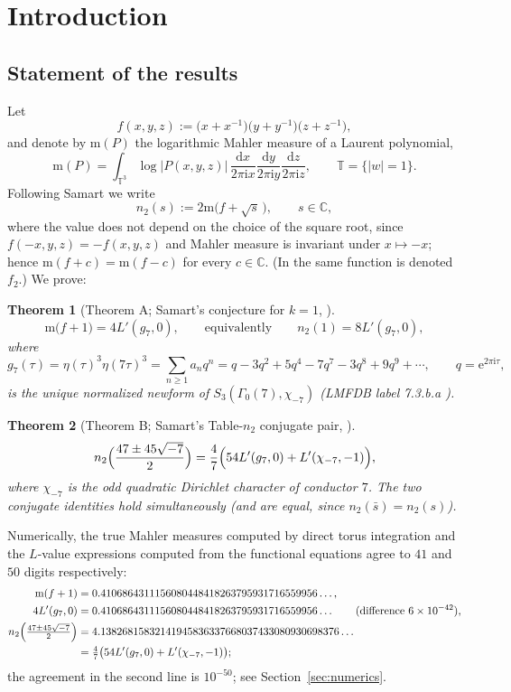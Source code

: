 \documentclass[11pt]{article}
\newtheorem{theorem}{Theorem}[section]
\theoremstyle{definition}
\theoremstyle{remark}
\newcommand{\Cc}{\mathbb{C}}
\newcommand{\Tt}{\mathbb{T}}
\newcommand{\ii}{\mathrm{i}}
\newcommand{\e}{\mathrm{e}}
\newcommand{\id}{\mathrm{d}}
\newcommand{\m}{\mathrm{m}}
\begin{document}
\section{Introduction}

\subsection{Statement of the results}

Let
\[
  f(x,y,z):=\bigl(x+x^{-1}\bigr)\bigl(y+y^{-1}\bigr)\bigl(z+z^{-1}\bigr),
\]
and denote by $\m(P)$ the logarithmic Mahler measure of a Laurent
polynomial,
\[
  \m(P)=\int_{\Tt^3}\log|P(x,y,z)|\,
  \frac{\id x}{2\pi \ii x}\frac{\id y}{2\pi \ii y}\frac{\id z}{2\pi \ii z},
  \qquad \Tt=\{|w|=1\}.
\]
Following Samart \cite{Sa13,Sa15} we write
\begin{equation}\label{eq:f2def}
  n_2(s):=2\m\bigl(f+\sqrt{s}\,\bigr),\qquad s\in\Cc,
\end{equation}
where the value does not depend on the choice of the square root, since
$f(-x,y,z)=-f(x,y,z)$ and Mahler measure is invariant under
$x\mapsto -x$; hence $\m(f+c)=\m(f-c)$ for every $c\in\Cc$. (In
\cite{Sa13} the same function is denoted $f_2$.) We prove:

\begin{theorem}[Theorem A; Samart's conjecture for $k=1$, {\cite{Sa13,Sa15}}]\label{thm:A}
\[
  \m\bigl(f+1\bigr)=4L'(g_7,0),
  \qquad\text{equivalently}\qquad
  n_2(1)=8L'(g_7,0),
\]
where
\[
  g_7(\tau)=\eta(\tau)^3\eta(7\tau)^3=\sum_{n\ge1}a_nq^n
  =q-3q^2+5q^4-7q^7-3q^8+9q^9+\cdots,\qquad q=\e^{2\pi \ii\tau},
\]
is the unique normalized newform of $S_3(\Gamma_0(7),\chi_{-7})$
\textup{(}LMFDB label \textup{7.3.b.a} \cite{LMFDB}\textup{)}.
\end{theorem}

\begin{theorem}[Theorem B; Samart's Table-$n_2$ conjugate pair, {\cite{Sa15}}]\label{thm:B}
\[
  n_2\Bigl(\frac{47\pm45\sqrt{-7}}2\Bigr)
  =\frac47\Bigl(54L'(g_7,0)+L'(\chi_{-7},-1)\Bigr),
\]
where $\chi_{-7}$ is the odd quadratic Dirichlet character of conductor
$7$. The two conjugate identities hold simultaneously \textup{(}and are
equal, since $n_2(\bar s)=n_2(s)$\textup{)}.
\end{theorem}

Numerically, the true Mahler measures computed by direct torus integration
and the $L$-value expressions computed from the functional equations agree
to $41$ and $50$ digits respectively:
\begin{align*}
  \m(f+1)&=0.4106864311156080448418263795931716559956\ldots,\\
  4L'(g_7,0)&=0.4106864311156080448418263795931716559956\ldots
   \qquad(\text{difference }6\times10^{-42}),\\
  n_2\Bigl(\tfrac{47\pm45\sqrt{-7}}2\Bigr)
   &=4.13826815832141945836337668037433080930698376\ldots\\
   &=\tfrac47\bigl(54L'(g_7,0)+L'(\chi_{-7},-1)\bigr);
\end{align*}
the agreement in the second line is $10^{-50}$; see
Section~\ref{sec:numerics}.
\end{document}
